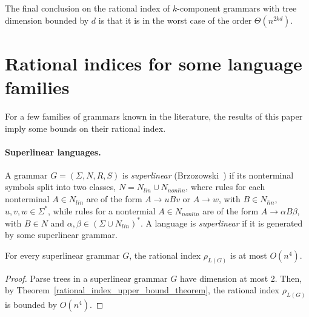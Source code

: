 \documentclass[runningheads]{llncs}
\begin{document}
The final conclusion on the rational index of $k$-component grammars with tree dimension bounded by $d$
is that it is in the worst case of the order $\Theta(n^{2kd})$.

\section{Rational indices for some language families}\label{section_implications}

For a few families of grammars known in the literature,
the results of this paper imply some bounds on their rational index.

\paragraph{Superlinear languages.}
A grammar $G = (\Sigma, N, R, S)$ is \textit{superlinear} (Brzozowski~\cite{superlinear})
if its nonterminal symbols split into two classes, $N = N_{lin} \cup N_{nonlin}$,
where rules for each nonterminal $A \in N_{lin}$
are of the form $A \to uBv$ or $A \to w$, with $B \in N_{lin}$, $u,v,w \in \Sigma^*$,
while rules for a nontermial $A \in N_{nonlin}$
are of the form $A \to \alpha B \beta$, with $B \in N$ and $\alpha,\beta \in (\Sigma \cup N_{lin})^*$.
A language is \textit{superlinear} if it is generated by some superlinear grammar. 

\begin{corollary}
For every superlinear grammar $G$,
the rational index $\rho_{L(G)}$ is at most $O(n^4)$.
\end{corollary}
\begin{proof}
Parse trees in a superlinear grammar $G$ have dimension at most 2.
Then, by Theorem~\ref{rational_index_upper_bound_theorem},
the rational index $\rho_{L(G)}$ is bounded by $O(n^4)$.
\end{proof}
\end{document}
